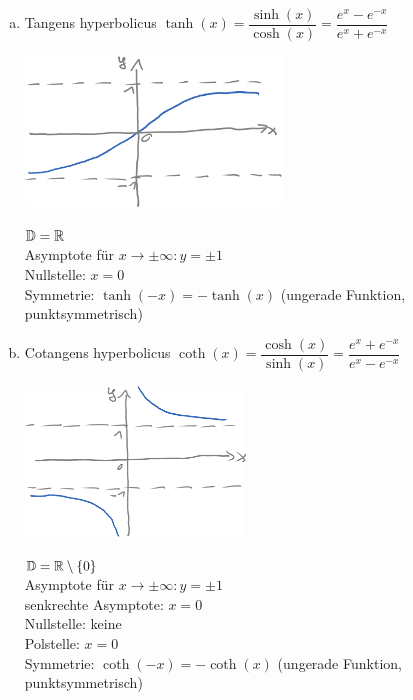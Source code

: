 \begin{enumerate}[a)]
	\item Tangens hyperbolicus $\tanh(x)=\dfrac{\sinh(x)}{\cosh(x)}=\dfrac{e^x-e^{-x}}{e^x+e^{-x}}$\\
	\begin{minipage}{0.48\linewidth}
		\centering\includegraphics[height=4cm]{Bilder/209}
	\end{minipage}
	\begin{minipage}{0.48\linewidth}
		$\mathbb{D}=\mathbb{R}$\\
		Asymptote für $x\to\pm\infty:y=\pm1$\\
		Nullstelle: $x=0$\\
		Symmetrie: $\tanh(-x)=-\tanh(x)$ (ungerade Funktion, punktsymmetrisch)
	\end{minipage}
	
	\clearpage
	\item Cotangens hyperbolicus $\coth(x)=\dfrac{\cosh(x)}{\sinh(x)}=\dfrac{e^x+e^{-x}}{e^x-e^{-x}}$\\
	\begin{minipage}{0.48\linewidth}
		\centering\includegraphics[height=4cm]{Bilder/210}
	\end{minipage}
	\begin{minipage}{0.48\linewidth}
		$\mathbb{D}=\mathbb{R}\setminus\{0\}$\\
		Asymptote für $x\to\pm\infty:y=\pm1$\\
		senkrechte Asymptote: $x=0$\\
		Nullstelle: keine\\
		Polstelle: $x=0$\\
		Symmetrie: $\coth(-x)=-\coth(x)$ (ungerade Funktion, punktsymmetrisch)
	\end{minipage}
\end{enumerate}


